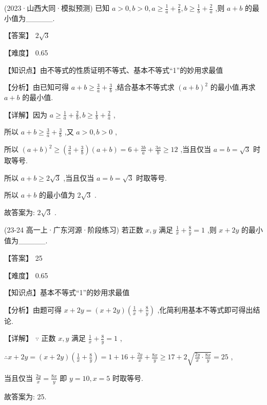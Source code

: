 \documentclass[11pt,a4paper]{article}
\begin{document}
\begin{hmwk} 
 (2023·山西大同·模拟预测) 已知 \(\displaystyle a > 0,b > 0,a \geq  \frac{1}{a} + \frac{2}{b},b \geq  \frac{1}{b} + \frac{2}{a}\) ,则 \(\displaystyle a + b\) 的最小值为\_\_\_\_\_.

\begin{jiexi}
【答案】 \(\displaystyle 2\sqrt{3}\)

【难度】 0.65

【知识点】由不等式的性质证明不等式、基本不等式“1”的妙用求最值

【分析】由已知可得 \(\displaystyle a + b \geq  \frac{3}{a} + \frac{3}{b}\) ,结合基本不等式求 \(\displaystyle {\left( a + b\right) }^{2}\) 的最小值,再求 \(\displaystyle a + b\) 的最小值.

【详解】因为 \(\displaystyle a \geq  \frac{1}{a} + \frac{2}{b},b \geq  \frac{1}{b} + \frac{2}{a}\) ,

所以 \(\displaystyle a + b \geq  \frac{3}{a} + \frac{3}{b}\) ,又 \(\displaystyle a > 0,b > 0\) ,

所以 \(\displaystyle {\left( a + b\right) }^{2} \geq  \left( {\frac{3}{a} + \frac{3}{b}}\right) \left( {a + b}\right)  = 6 + \frac{3b}{a} + \frac{3a}{b} \geq  {12}\) ,当且仅当 \(\displaystyle a = b = \sqrt{3}\) 时取等号.

所以 \(\displaystyle a + b \geq  2\sqrt{3}\) ,当且仅当 \(\displaystyle a = b = \sqrt{3}\) 时取等号.

所以 \(\displaystyle a + b\) 的最小值为 \(\displaystyle 2\sqrt{3}\) .

故答案为: \(\displaystyle 2\sqrt{3}\) .

\end{jiexi}
\end{hmwk}
\begin{hmwk} 
 (23-24 高一上·广东河源·阶段练习) 若正数 \(\displaystyle x,y\) 满足 \(\displaystyle \frac{1}{x} + \frac{8}{y} = 1\) ,则 \(\displaystyle x + {2y}\) 的最小值为\_\_\_\_\_.

\begin{jiexi}
【答案】 25

【难度】 0.65

【知识点】基本不等式“1”的妙用求最值

【分析】由题可得 \(\displaystyle x + {2y} = \left( {x + {2y}}\right) \left( {\frac{1}{x} + \frac{8}{y}}\right)\) ,化简利用基本不等式即可得出结论.

【详解】 \(\displaystyle \because\) 正数 \(\displaystyle x,y\) 满足 \(\displaystyle \frac{1}{x} + \frac{8}{y} = 1\) ,

\(\displaystyle \therefore x + {2y} = \left( {x + {2y}}\right) \left( {\frac{1}{x} + \frac{8}{y}}\right)  = 1 + {16} + \frac{2y}{x} + \frac{8x}{y} \geq  {17} + 2\sqrt{\frac{2y}{x} \cdot  \frac{8x}{y}} = {25}\) ,

当且仅当 \(\displaystyle \frac{2y}{x} = \frac{8x}{y}\) 即 \(\displaystyle y = {10},x = 5\) 时取等号.

故答案为: 25.

\end{jiexi}
\end{hmwk}
\end{document}
